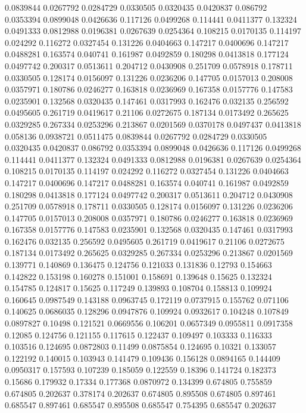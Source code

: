 0.0839844 0.0267792
0.0284729 0.0330505
0.0320435 0.0420837
0.086792 0.0353394
0.0899048 0.0426636
0.117126 0.0499268
0.114441 0.0411377
0.132324 0.0491333
0.0812988 0.0196381
0.0267639 0.0254364
0.108215 0.0170135
0.114197 0.024292
0.116272 0.0327454
0.131226 0.0404663
0.147217 0.0400696
0.147217 0.0488281
0.163574 0.040741
0.161987 0.0492859
0.180298 0.0413818
0.177124 0.0497742
0.200317 0.0513611
0.204712 0.0430908
0.251709 0.0578918
0.178711 0.0330505
0.128174 0.0156097
0.131226 0.0236206
0.147705 0.0157013
0.208008 0.0357971
0.180786 0.0246277
0.163818 0.0236969
0.167358 0.0157776
0.147583 0.0235901
0.132568 0.0320435
0.147461 0.0317993
0.162476 0.032135
0.256592 0.0495605
0.261719 0.0419617
0.21106 0.0272675
0.187134 0.0173492
0.265625 0.0329285
0.267334 0.0253296
0.213867 0.0201569
0.0370178 0.0497437
0.0413818 0.058136
0.0938721 0.0511475
0.0839844 0.0267792
0.0284729 0.0330505
0.0320435 0.0420837
0.086792 0.0353394
0.0899048 0.0426636
0.117126 0.0499268
0.114441 0.0411377
0.132324 0.0491333
0.0812988 0.0196381
0.0267639 0.0254364
0.108215 0.0170135
0.114197 0.024292
0.116272 0.0327454
0.131226 0.0404663
0.147217 0.0400696
0.147217 0.0488281
0.163574 0.040741
0.161987 0.0492859
0.180298 0.0413818
0.177124 0.0497742
0.200317 0.0513611
0.204712 0.0430908
0.251709 0.0578918
0.178711 0.0330505
0.128174 0.0156097
0.131226 0.0236206
0.147705 0.0157013
0.208008 0.0357971
0.180786 0.0246277
0.163818 0.0236969
0.167358 0.0157776
0.147583 0.0235901
0.132568 0.0320435
0.147461 0.0317993
0.162476 0.032135
0.256592 0.0495605
0.261719 0.0419617
0.21106 0.0272675
0.187134 0.0173492
0.265625 0.0329285
0.267334 0.0253296
0.213867 0.0201569
0.139771 0.140869
0.136475 0.124756
0.121033 0.131836
0.12793 0.154663
0.142822 0.153198
0.160278 0.151001
0.158691 0.139648
0.15625 0.132324
0.154785 0.124817
0.15625 0.117249
0.139893 0.108704
0.158813 0.109924
0.160645 0.0987549
0.143188 0.0963745
0.172119 0.0737915
0.155762 0.071106
0.140625 0.0686035
0.128296 0.0947876
0.109924 0.0932617
0.104248 0.107849
0.0897827 0.10498
0.121521 0.0669556
0.106201 0.0657349
0.0955811 0.0917358
0.12085 0.124756
0.121155 0.117615
0.122437 0.109497
0.103333 0.116333
0.103516 0.124695
0.0872803 0.11499
0.0875854 0.124695
0.10321 0.133057
0.122192 0.140015
0.103943 0.141479
0.109436 0.156128
0.0894165 0.144409
0.0950317 0.157593
0.107239 0.185059
0.122559 0.18396
0.141724 0.182373
0.15686 0.179932
0.17334 0.177368
0.0870972 0.134399
0.674805 0.755859
0.674805 0.202637
0.378174 0.202637
0.674805 0.895508
0.674805 0.897461
0.685547 0.897461
0.685547 0.895508
0.685547 0.754395
0.685547 0.202637
